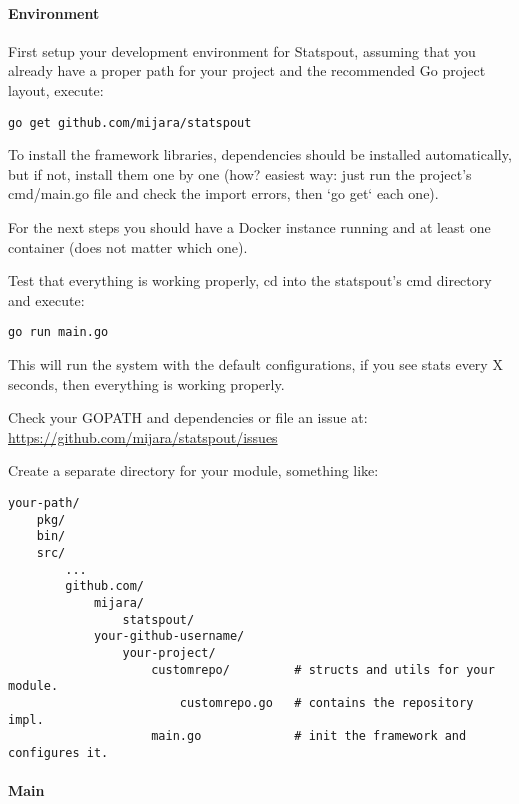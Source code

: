 \paragraph{Environment}

First setup your development environment for Statspout, assuming that you already have a proper path for your project and the recommended Go project layout, execute:

\begin{lstlisting}
go get github.com/mijara/statspout
\end{lstlisting}

To install the framework libraries, dependencies should be installed automatically, but if not, install them one by one (how? easiest way: just run the project's cmd/main.go file and check the import errors, then `go get` each one).

For the next steps you should have a Docker instance running and at least one container (does not matter which one).

Test that everything is working properly, cd into the statspout's cmd directory and execute:

\begin{lstlisting}
go run main.go
\end{lstlisting}

This will run the system with the default configurations, if you see stats every X seconds, then everything is working properly.

\begin{story}
Check your GOPATH and dependencies or file an issue at: \url{https://github.com/mijara/statspout/issues}
\end{story}

Create a separate directory for your module, something like:

\begin{lstlisting}
your-path/
    pkg/
    bin/
    src/
        ...
        github.com/
            mijara/
                statspout/
            your-github-username/
                your-project/
                    customrepo/         # structs and utils for your module.
                        customrepo.go   # contains the repository impl.
                    main.go             # init the framework and configures it.
\end{lstlisting}

\paragraph{Main}

